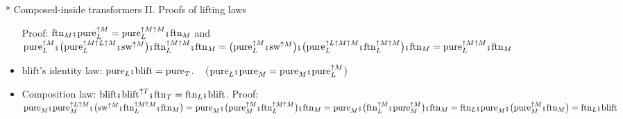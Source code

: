 \documentclass[english]{beamer}
\newcommand{\bef}{\hspace{0.5pt}\ensuremath\mathsmaller{\fatsemi}\hspace{1.5pt}}
\begin{document}
\begin{frame}{{*} Composed-inside transformers II. Proofs of lifting laws}
\begin{itemize}
{\footnotesize{}Proof: $\text{ftn}_{M}\bef\text{pure}_{L}^{\uparrow M}=\text{pure}_{L}^{\uparrow M\uparrow M}\bef\text{ftn}_{M}$
and $\text{pure}_{L}^{\uparrow M}\bef\big(\text{pure}_{L}^{\uparrow M\uparrow L\uparrow M}\bef\text{sw}^{\uparrow M}\big)\bef\text{ftn}_{L}^{\uparrow M\uparrow M}\bef\text{ftn}_{M}=\big(\text{pure}_{L}^{\uparrow M}\bef\text{sw}^{\uparrow M}\big)\bef\big(\text{pure}_{L}^{\uparrow L\uparrow M\uparrow M}\bef\text{ftn}_{L}^{\uparrow M\uparrow M}\big)\bef\text{ftn}_{M}=\text{pure}_{L}^{\uparrow M\uparrow M}\bef\text{ftn}_{M}$}{\footnotesize\par}
\item $\text{blift}$'s identity law: $\text{pure}_{L}\bef\text{blift}=\text{pure}_{T}$.{\footnotesize{}
~ ($\text{pure}_{L}\bef\text{pure}_{M}=\text{pure}_{M}\bef\text{pure}_{L}^{\uparrow M}$)}{\footnotesize\par}
\item Composition law: $\text{blift}\bef\text{blift}^{\uparrow T}\bef\text{ftn}_{T}=\text{ftn}_{L}\bef\text{blift}$.
{\footnotesize{}Proof: $\text{pure}_{M}\bef\text{pure}_{M}^{\uparrow L\uparrow M}\bef\big(\text{sw}^{\uparrow M}\bef\text{ftn}_{L}^{\uparrow M\uparrow M}\bef\text{ftn}_{M}\big)=\text{pure}_{M}\bef\big(\text{pure}_{M}^{\uparrow M}\bef\text{ftn}_{L}^{\uparrow M\uparrow M}\big)\bef\text{ftn}_{M}=\text{pure}_{M}\bef\big(\text{ftn}_{L}^{\uparrow M}\bef\text{pure}_{M}^{\uparrow M}\big)\bef\text{ftn}_{M}=\text{ftn}_{L}\bef\text{pure}_{M}\bef\big(\text{pure}_{M}^{\uparrow M}\bef\text{ftn}_{M}\big)=\text{ftn}_{L}\bef\text{blift}$}{\footnotesize\par}
\end{itemize}
\end{frame}
\end{document}
